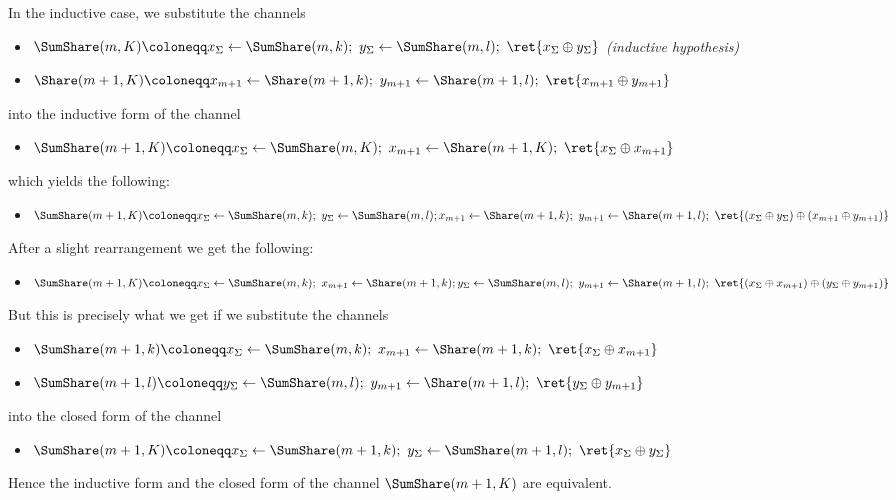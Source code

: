 \begin{itemize}
In the inductive case, we substitute the channels
\begin{itemize}
\item $\SumShare(m,K) \coloneqq x_\Sigma \leftarrow \SumShare(m,k); \ y_\Sigma \leftarrow \SumShare(m,l); \ \ret{x_\Sigma \oplus y_\Sigma}$ \emph{(inductive hypothesis)}
\item $\Share(m+1,K) \coloneqq x_{m+1} \leftarrow \Share(m+1,k); \ y_{m+1} \leftarrow \Share(m+1,l); \ \ret{x_{m+1} \oplus y_{m+1}}$
\end{itemize}
into the inductive form of the channel
\begin{itemize}
\item $\SumShare(m+1,K) \coloneqq x_\Sigma \leftarrow \SumShare(m,K); \ x_{m+1} \leftarrow \Share(m+1,K); \ \ret{x_\Sigma \oplus x_{m+1}}$
\end{itemize}
which yields the following:
\begin{itemize}
\item $\SumShare(m+1,K) \coloneqq x_\Sigma \leftarrow \SumShare(m,k); \ y_\Sigma \leftarrow \SumShare(m,l); \\ x_{m+1} \leftarrow \Share(m+1,k); \ y_{m+1} \leftarrow \Share(m+1,l); \ \ret{(x_\Sigma \oplus y_\Sigma) \oplus (x_{m+1} \oplus y_{m+1})}$
\end{itemize}
After a slight rearrangement we get the following:
\begin{itemize}
\item $\SumShare(m+1,K) \coloneqq x_\Sigma \leftarrow \SumShare(m,k); \ x_{m+1} \leftarrow \Share(m+1,k); \\ y_\Sigma \leftarrow \SumShare(m,l); \ y_{m+1} \leftarrow \Share(m+1,l); \ \ret{(x_\Sigma \oplus x_{m+1}) \oplus (y_\Sigma \oplus y_{m+1})}$
\end{itemize}
But this is precisely what we get if we substitute the channels
\begin{itemize}
\item $\SumShare(m+1,k) \coloneqq x_\Sigma \leftarrow \SumShare(m,k); \ x_{m+1} \leftarrow \Share(m+1,k); \ \ret{x_\Sigma \oplus x_{m+1}}$
\item $\SumShare(m+1,l) \coloneqq y_\Sigma \leftarrow \SumShare(m,l); \ y_{m+1} \leftarrow \Share(m+1,l); \ \ret{y_\Sigma \oplus y_{m+1}}$
\end{itemize}
into the closed form of the channel
\begin{itemize}
\item $\SumShare(m+1,K) \coloneqq x_\Sigma \leftarrow \SumShare(m+1,k); \ y_\Sigma \leftarrow \SumShare(m+1,l); \ \ret{x_\Sigma \oplus y_\Sigma}$
\end{itemize}
Hence the inductive form and the closed form of the channel $\SumShare(m+1,K)$ are equivalent.


\end{itemize}
